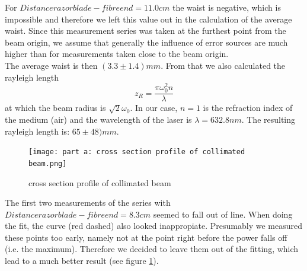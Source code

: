 \documentclass{article}
\begin{document}
 For $Distance razor blade - fibre end = 11.0 cm$ the waist is negative, which is impossible and therefore we left this value out in the calculation of the average waist. Since this measurement series was taken at the furthest point from the beam origin, we assume that generally the influence of error sources are much higher than for measurements taken close to the beam origin.\\

The average waist is then $(3.3\pm 1.4) mm$. From that we also calculated the rayleigh length 
\begin{equation}
z_{R} = \frac{\pi\omega_{0}^2 n}{\lambda} 
\label{rayleighlength}
\end{equation}
at which the beam radius is $\sqrt{2}\omega_{0}$. In our case, $n=1$ is the refraction index of the medium (air) and the wavelength of the laser is $\lambda =632.8 nm$. The resulting rayleigh length is:
$65 \pm 48) mm$.\\

\begin{figure}
\texttt{[image: part a: cross section profile of collimated beam.png]}
\caption{cross section profile of collimated beam}
\label{part_a_fig} %
\end{figure}

The first two measurements of the series with $Distance razor blade - fibre end = 8.3 cm$ seemed to fall out of line. When doing the fit, the curve (red dashed) also looked inappropiate. Presumably we measured these points too early, namely not at the point right before the power falls off (i.e. the maximum). Therefore we decided to leave them out of the fitting, which lead to a much better result (see figure \ref{part_a_fig}).
\end{document}
